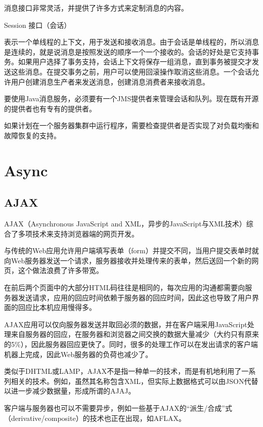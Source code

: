 \begin{compactitem}
消息接口非常灵活，并提供了许多方式来定制消息的内容。

\item Session 接口（会话）

表示一个单线程的上下文，用于发送和接收消息。由于会话是单线程的，所以消息是连续的，就是说消息是按照发送的顺序一个一个接收的。会话的好处是它支持事务。如果用户选择了事务支持，会话上下文将保存一组消息，直到事务被提交才发送这些消息。在提交事务之前，用户可以使用回滚操作取消这些消息。一个会话允许用户创建消息生产者来发送消息，创建消息消费者来接收消息。

\end{compactitem}

要使用Java消息服务，必须要有一个JMS提供者来管理会话和队列。现在既有开源的提供者也有专有的提供者。

如果计划在一个服务器集群中运行程序，需要检查提供者是否实现了对负载均衡和故障恢复的支持。

\section{Async}


\subsection{AJAX}

AJAX（Asynchronous JavaScript and XML，异步的JavaScript与XML技术）综合了多项技术来支持浏览器端的网页开发。

与传统的Web应用允许用户端填写表单（form）并提交不同，当用户提交表单时就向Web服务器发送一个请求，服务器接收并处理传来的表单，然后送回一个新的网页，这个做法浪费了许多带宽。

在前后两个页面中的大部分HTML码往往是相同的，每次应用的沟通都需要向服务器发送请求，应用的回应时间依赖于服务器的回应时间，因此这也导致了用户界面的回应比本机应用慢得多。

AJAX应用可以仅向服务器发送并取回必须的数据，并在客户端采用JavaScript处理来自服务器的回应，在服务器和浏览器之间交换的数据大量减少（大约只有原来的5\%），因此服务器回应更快了。同时，很多的处理工作可以在发出请求的客户端机器上完成，因此Web服务器的负荷也减少了。

类似于DHTML或LAMP，AJAX不是指一种单一的技术，而是有机地利用了一系列相关的技术。例如，虽然其名称包含XML，但实际上数据格式可以由JSON代替以进一步减少数据量，形成所谓的AJAJ。

客户端与服务器也可以不需要异步，例如一些基于AJAX的“派生/合成”式（derivative/composite）的技术也正在出现，如AFLAX。





